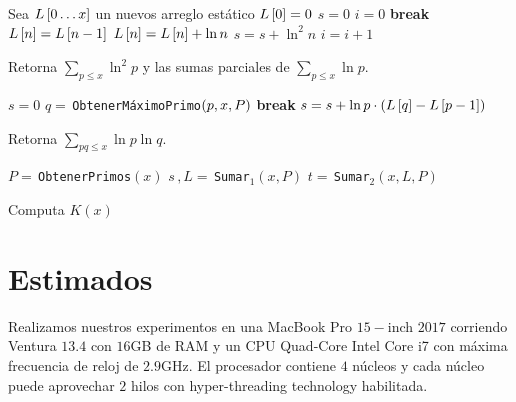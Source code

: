 \begin{algorithm}[H]
    \SetAlgoLined
    \DontPrintSemicolon
     {
        Sea \(L\left[ 0 \dots x \right]\) un nuevos arreglo est\'atico\;
        \(L\left[ 0 \right] = 0\)\;
        \(s = 0\)\;
        \(i = 0\)\;
         {
             {
                \textbf{break}\;
            }
            \(L\left[ n \right] = L\left[ n - 1 \right]\)\;
             {
                \(L\left[ n \right] = L\left[ n \right] + \ln n\)\;
                \(s = s + \ln^2 n\)\;
                \(i = i + 1\)\;
            }
        }
    }
    \caption{Retorna \(\sum_{p \leq x} \ln^2 p\) y las sumas parciales de \(\sum_{p \leq x} \ln p\).}
\end{algorithm}

\begin{algorithm}[H]
    \SetAlgoLined
    \DontPrintSemicolon
     {
        \(s = 0\)\;
         {
            \(q =\,\)\texttt{ObtenerM\'aximoPrimo}\(\left( p, x, P \right)\)\;
             {
                \textbf{break}\;
            }
            \(s = s + \ln p \cdot \left( L\left[ q \right] - L\left[ p - 1 \right] \right)\)\;
        }
    }
    \caption{Retorna \(\sum_{pq \leq x} \ln p \ln q\).}
\end{algorithm}

\begin{algorithm}[H]
    \SetAlgoLined
    \DontPrintSemicolon
     {
        \(P = \,\)\texttt{ObtenerPrimos}\((x)\)\;
        \(s \, , L = \,\)\texttt{Sumar}\(_1(x, P)\)\;
        \(t = \,\)\texttt{Sumar}\(_2(x, L, P)\)\;
    }
    \caption{Computa \(K(x)\)}
\end{algorithm}

\section{Estimados}

Realizamos nuestros experimentos en una
MacBook Pro \(15-\)inch \(2017\)
corriendo Ventura \(13.4\)
con \(16\)GB de RAM y
un CPU Quad-Core Intel Core i7
con m\'axima frecuencia de reloj de \(2.9\)GHz.
El procesador contiene \(4\) n\'ucleos
y cada n\'ucleo puede aprovechar \(2\) hilos
con hyper-threading technology habilitada.

